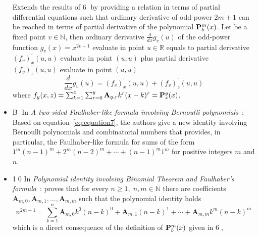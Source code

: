 \begin{itemize}
    Extends the results of {\Large \textcircled{\normalsize 6}} by providing a relation in terms of partial differential equations such that
    ordinary derivative of odd-power $2m+1$ can be reached in terms of partial derivative of the polynomial ${\mathbf{P}}\sp{m} \sb{b}(x)$.
    Let be a fixed point $v\in \mathbb{N}$, then ordinary derivative $\frac{d}{dx} g_v (u)$ of the odd-power function $g_v(x) = x^{2v + 1}$
    evaluate in point $u\in\mathbb{R}$ equals to partial derivative $(f_{v})^{'}_{x} (u, u)$ evaluate in point $(u, u)$ plus
    partial derivative $(f_{v})^{'}_{z} (u, u)$ evaluate in point $(u, u)$
    \begin{equation}
        \frac{d}{dx} g_v (u) = (f_{v})^{'}_{x} (u, u) + (f_{v})^{'}_{z} (u, u)
        \label{eq:odd-exponential-identity}
    \end{equation}
    where $f_{y} (x, z) = \sum_{k=1}^{z} \sum_{r=0}^{y} {\mathbf{A}} \sb{y,r} k^r (x-k)^r = {\mathbf{P}}\sp{y} \sb{z}(x)$.
    \item {\Large \textcircled{\normalsize B}}
    In \textit{A two-sided Faulhaber-like formula involving Bernoulli polynomials}~\cite{barbero2020two}:
    Based on equation~\eqref{eq:equation7}, the authors give a new identity involving
    Bernoulli polynomials and combinatorial numbers that provides,
    in particular, the Faulhaber-like formula for sums of the form $1^m(n-1)^m + 2^m (n -2)^m + \cdots + (n - 1)^m 1^m$
    for positive integers $m$ and $n$.
    \item {\Large \textcircled{\normalsize 10}}
    In \textit{Polynomial identity involving Binomial Theorem and Faulhaber's formula}~\cite{kolosov2023polynomial}:
    proves that
    for every $n\geq 1, \; n,m\in\mathbb{N}$
    there are coefficients $\mathbf{A}_{m,0}, \mathbf{A}_{m,1}, \ldots, \mathbf{A}_{m,m}$ such that
    the polynomial identity holds
    \[
        n^{2m+1} = \sum_{k=1}^{n} \mathbf{A}_{m,0} k^0 (n-k)^0 + \mathbf{A}_{m,1}(n-k)^1
        + \cdots + \mathbf{A}_{m,m} k^m (n-k)^m
    \]
    which is a direct consequence of the definition of ${\mathbf{P}}\sp{m} \sb{b}(x)$ given in {\Large \textcircled{\normalsize 6}},

\end{itemize}
